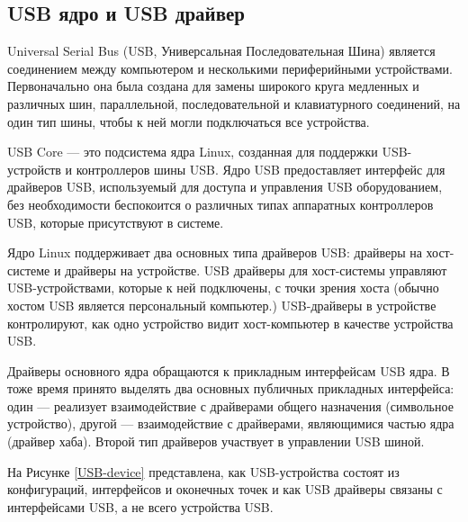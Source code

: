 \subsection{USB ядро и USB драйвер}
Universal Serial Bus (USB, Универсальная Последовательная Шина) является соединением
между компьютером и несколькими периферийными устройствами. Первоначально она была
создана для замены широкого круга медленных и различных шин, параллельной,
последовательной и клавиатурного соединений, на один тип шины, чтобы к ней могли
подключаться все устройства\cite{Corbet}.\par

USB Core — это подсистема ядра Linux, созданная для поддержки USB-устройств и контроллеров шины USB. Ядро USB предоставляет интерфейс для драйверов USB, используемый для доступа и
управления USB оборудованием, без необходимости беспокоится о различных типах
аппаратных контроллеров USB, которые присутствуют в системе.\par

Ядро Linux поддерживает два основных типа драйверов USB: драйверы на хост-системе и
драйверы на устройстве. USB драйверы для хост-системы управляют USB-устройствами,
которые к ней подключены, с точки зрения хоста (обычно хостом USB является персональный
компьютер.) USB-драйверы в устройстве контролируют, как одно устройство видит хост-компьютер в качестве устройства USB.\par
Драйверы основного ядра обращаются к прикладным
интерфейсам USB ядра. В тоже время принято выделять два основных
публичных прикладных интерфейса: один --- реализует взаимодействие с
драйверами общего назначения (символьное устройство), другой ---
взаимодействие с драйверами, являющимися частью ядра (драйвер хаба).
Второй тип драйверов участвует в управлении USB шиной.\par
На Рисунке \ref{USB-device} 
представлена, как USB-устройства состоят из конфигураций, интерфейсов и оконечных точек и как USB
драйверы связаны с интерфейсами USB, а не всего устройства USB.

